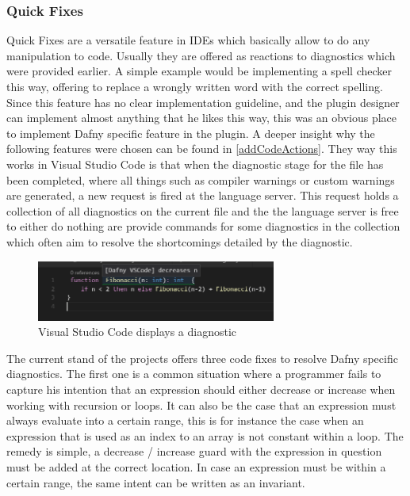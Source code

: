 \subsubsection{Quick Fixes} \label{quickfixes}
Quick Fixes are a versatile feature in IDEs which basically allow to do any manipulation to code. Usually they are offered as reactions to diagnostics which were provided earlier. A simple example would be implementing a spell checker this way, offering to replace a wrongly written word with the correct spelling. \newline
Since this feature has no clear implementation guideline, and the plugin designer can implement almost anything that he likes this way, this was an obvious place to implement Dafny specific feature in the plugin. A deeper insight why the following features were chosen can be found in \ref{addCodeActions}. \newline
They way this works in Visual Studio Code is that when the diagnostic stage for the file has been completed, where all things such as compiler warnings or custom warnings are generated, a new request is fired at the language server. This request holds a collection of all diagnostics on the current file and the the language server is free to either do nothing are provide commands for some diagnostics in the collection which often aim to resolve the shortcomings detailed by the diagnostic. \newline
  \begin{figure}[H]
	\centering
	\includegraphics[width=0.7\textwidth]{img/diagnostic}
	\caption{Visual Studio Code displays a diagnostic}
	\label{fig:diagnostic}
\end{figure}
The current stand of the projects offers three code fixes to resolve Dafny specific diagnostics. \newline
The first one is a common situation where a programmer fails to capture his intention that an expression should either decrease or increase when working with recursion or loops. It can also be the case that an expression must always evaluate into a certain range, this is for instance the case when an expression that is used as an index to an array is not constant within a loop. The remedy is simple, a decrease / increase guard with the expression in question must be added at the correct location. In case an expression must be within a certain range, the same intent can be written as an invariant. \newline
